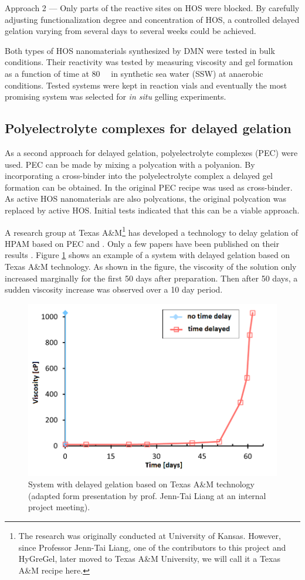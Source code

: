 \documentclass[energies,article,submit,moreauthors,pdftex]{Definitions/mdpi}
\begin{document}
    Approach 2 --- Only parts of the reactive sites on HOS were blocked. By carefully adjusting functionalization degree and concentration of HOS, a controlled delayed gelation varying from several days to several weeks could be achieved. 
    
Both types of HOS nanomaterials synthesized by DMN were tested in bulk conditions. Their reactivity was tested by measuring viscosity and gel formation as a function of time at 80~\celsius~ in synthetic sea water (SSW) at anaerobic conditions. Tested systems were kept in reaction vials and eventually the most promising system  was selected for \textit{in situ} gelling experiments.
    
\subsection{Polyelectrolyte complexes for delayed gelation}
As a second approach for delayed gelation, polyelectrolyte complexes (PEC) were used. PEC can be made by mixing a polycation with a polyanion. By incorporating a cross-binder into the polyelectrolyte complex a delayed gel formation can be obtained. In the original PEC recipe  was used as cross-binder. As active HOS nanomaterials are also polycations, the original polycation was replaced by active HOS. Initial tests indicated that this can be a viable approach.

A research group at Texas A\&M\footnote{The research was originally conducted at University of Kansas. However, since Professor Jenn-Tai Liang, one of the contributors to this project and HyGreGel, later moved to Texas A\&M University, we will call it a Texas A\&M recipe here.} has developed a technology to delay gelation of HPAM based on PEC and . Only a few papers have been published on their results \citep{Cordova2008,Johnson2010}. Figure \ref{cht:jennTai} shows an example of a system with delayed gelation based on Texas A\&M technology. As shown in the figure, the viscosity of the solution only increased marginally for the first 50 days after preparation. Then after 50 days, a sudden viscosity increase was observed over a 10 day period.

\begin{figure}[h!]
    \centering
    \includegraphics[width=.5\textwidth]{fig/jennTai.png}
    \caption{System with delayed gelation based on Texas A\&M technology \citep{Cordova2008} (adapted form presentation by prof. Jenn-Tai Liang at an internal project meeting).}
    \label{cht:jennTai}
\end{figure}
    
\end{document}
